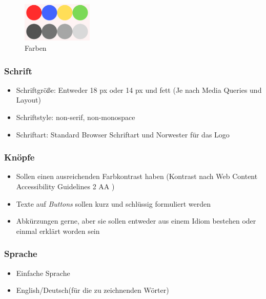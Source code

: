 \documentclass[11pt]{article}
\begin{document}
\begin{figure}[ht]
\centering
\includegraphics[width=0.3\textwidth]{images/colors.png}
\caption{\label{fig:colors}Farben}
\end{figure}

\subsubsection{Schrift}
\begin{itemize}
\item Schriftgröße: Entweder 18 px oder 14 px und fett (Je nach Media Queries und Layout)
\item Schriftstyle: non-serif, non-monospace
\item Schriftart: Standard Browser Schriftart und Norwester für das Logo
\end{itemize}

\subsubsection{Knöpfe}
\begin{itemize}
\item Sollen einen ausreichenden Farbkontrast haben (Kontrast nach Web Content Accessibility Guidelines 2 AA \parencite{Caldwell2008})
\item Texte auf \textit{Buttons} sollen kurz und schlüssig formuliert werden
\item Abkürzungen gerne, aber sie sollen entweder aus einem Idiom bestehen oder einmal erklärt worden sein
\end{itemize}

\subsubsection{Sprache}
\begin{itemize}
\item Einfache Sprache
\item English/Deutsch(für die zu zeichnenden Wörter)
\end{itemize}

\pagebreak
\printbibliography
\end{document}
